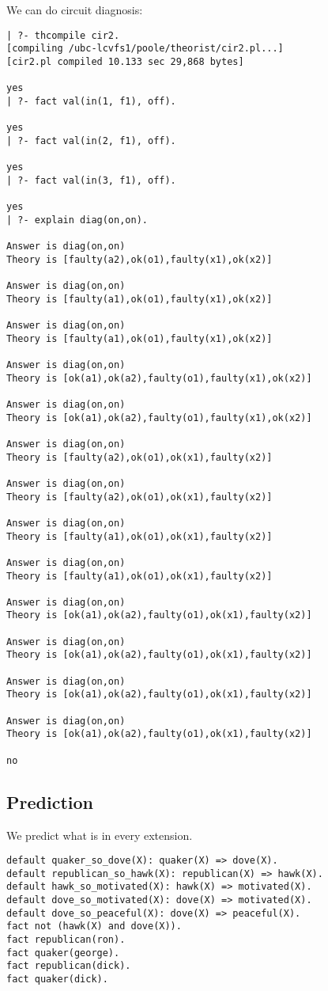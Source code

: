 We can do circuit diagnosis:
\begin{verbatim}
| ?- thcompile cir2.
[compiling /ubc-lcvfs1/poole/theorist/cir2.pl...]
[cir2.pl compiled 10.133 sec 29,868 bytes]
 
yes
| ?- fact val(in(1, f1), off).
 
yes
| ?- fact val(in(2, f1), off).
 
yes
| ?- fact val(in(3, f1), off).
 
yes
| ?- explain diag(on,on).

Answer is diag(on,on)
Theory is [faulty(a2),ok(o1),faulty(x1),ok(x2)]

Answer is diag(on,on)
Theory is [faulty(a1),ok(o1),faulty(x1),ok(x2)]

Answer is diag(on,on)
Theory is [faulty(a1),ok(o1),faulty(x1),ok(x2)]

Answer is diag(on,on)
Theory is [ok(a1),ok(a2),faulty(o1),faulty(x1),ok(x2)]

Answer is diag(on,on)
Theory is [ok(a1),ok(a2),faulty(o1),faulty(x1),ok(x2)]

Answer is diag(on,on)
Theory is [faulty(a2),ok(o1),ok(x1),faulty(x2)]

Answer is diag(on,on)
Theory is [faulty(a2),ok(o1),ok(x1),faulty(x2)]

Answer is diag(on,on)
Theory is [faulty(a1),ok(o1),ok(x1),faulty(x2)]

Answer is diag(on,on)
Theory is [faulty(a1),ok(o1),ok(x1),faulty(x2)]

Answer is diag(on,on)
Theory is [ok(a1),ok(a2),faulty(o1),ok(x1),faulty(x2)]

Answer is diag(on,on)
Theory is [ok(a1),ok(a2),faulty(o1),ok(x1),faulty(x2)]

Answer is diag(on,on)
Theory is [ok(a1),ok(a2),faulty(o1),ok(x1),faulty(x2)]

Answer is diag(on,on)
Theory is [ok(a1),ok(a2),faulty(o1),ok(x1),faulty(x2)]

no
\end{verbatim}
\subsection{Prediction}
We predict what is in every extension.
\begin{verbatim}
default quaker_so_dove(X): quaker(X) => dove(X).
default republican_so_hawk(X): republican(X) => hawk(X).
default hawk_so_motivated(X): hawk(X) => motivated(X).
default dove_so_motivated(X): dove(X) => motivated(X).
default dove_so_peaceful(X): dove(X) => peaceful(X).
fact not (hawk(X) and dove(X)).
fact republican(ron).
fact quaker(george).
fact republican(dick).
fact quaker(dick).
\end{verbatim}

